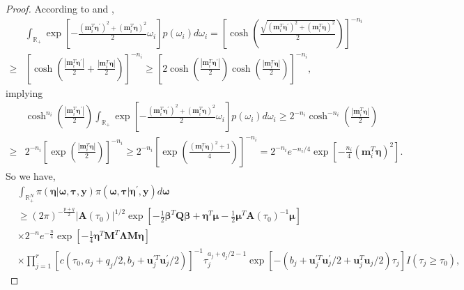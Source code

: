 \documentclass[11pt,a4paper]{article}
\begin{document}
\begin{proof}
According to \cite{polson2013bayesian} and \cite{choi2013polya}, 
\begin{align*}
 & \int_{\mathbb{R}_{+}}\exp\left[-\frac{\left(\bm{m}_{i}^{T}\bm{\eta}^{\prime}\right)^{2}+\left(\bm{m}_{i}^{T}\bm{\eta}\right)^{2}}{2}\omega_{i}\right]p\left(\omega_{i}\right)d\omega_{i} =  \left[\cosh\left(\frac{\sqrt{\left(\bm{m}_{i}^{T}\bm{\eta}^{\prime}\right)^{2}+\left(\bm{m}_{i}^{T}\bm{\eta}\right)^{2}}}{2}\right)\right]^{-n_{i}}\\
\geq & \left[\cosh\left(\frac{\left|\bm{m}_{i}^{T}\bm{\eta}^{\prime}\right|}{2}+\frac{ \left| \bm{m}_{i}^{T}\bm{\eta}\right|}{2}\right)\right]^{-n_{i}}
\geq  \left[2\cosh\left(\frac{\left|\bm{m}_{i}^{T}\bm{\eta}^{\prime}\right|}{2}\right)\cosh\left(\frac{\left|\bm{m}_{i}^{T}\bm{\eta}\right|}{2}\right)\right]^{-n_{i}},
\end{align*}
implying
\begin{align*}
 & \cosh^{n_{i}}\left(\frac{\left|\bm{m}_{i}^{T}\bm{\eta}^{\prime}\right|}{2}\right)\int_{\mathbb{R}_{+}}\exp\left[-\frac{\left(\bm{m}_{i}^{T}\bm{\eta}^{\prime}\right)^{2}+\left(\bm{m}_{i}^{T}\bm{\eta}\right)^{2}}{2}\omega_{i}\right]p\left(\omega_{i}\right)d\omega_{i} \geq 2^{-n_{i}}\cosh^{-n_{i}}\left(\frac{\left|\bm{m}_{i}^{T}\bm{\eta}\right|}{2}\right)\\
\geq & 2^{-n_{i}}\left[\exp\left(\frac{\left|\bm{m}_{i}^{T}\bm{\eta}\right|}{2}\right)\right]^{-n_{i}}\geq 2^{-n_{i}}\left[\exp\left(\frac{\left(\bm{m}_{i}^{T}\bm{\eta}\right)^{2}+1}{4}\right)\right]^{-n_{i}}
=  2^{-n_{i}}e^{-n_{i}/4}\exp\left[-\frac{n_{i}}{4}\left(\bm{m}_{i}^{T}\bm{\eta}\right)^{2}\right].
\end{align*}
So we have,
\begin{align*}
& \int_{\mathbb{R}_{+}^{N}}\pi(\bm{\eta}|\bm{\omega},\bm{\tau},\bm{y})\pi(\bm{\omega,\tau}|\bm{\eta}^{\prime},\bm{y})d\bm{\omega}\\
& \geq\left(2\pi\right)^{-\frac{p+q}{2}}\left|\bm{A}\left(\tau_{0}\right)\right|^{1/2}\exp\left[-\frac{1}{2}\bm{\beta}^{T}\bm{Q}\bm{\beta}+\bm{\eta}^{T}\bm{\mu}-\frac{1}{2}\bm{\mu}^{T}\bm{A}\left(\tau_{0}\right)^{-1}\bm{\mu}\right]\\
& \times 2^{-n}e^{-\frac{n}{4}}\exp\left[-\frac{1}{4}\bm{\eta}^{T}\bm{M}^{T}\bm{\Lambda}\bm{M}\bm{\eta}\right]\\
& \times\prod_{j=1}^{r}[c\left(\tau_{0},a_{j} + q_j/2,b_{j} +\bm{u}_{j}^{\prime T}\bm{u}_{j}^{\prime}/2\right)]^{-1}\tau_{j}^{a_{j}+q_{j}/2-1}\exp\left[-\left(b_{j}+\bm{u}_{j}^{\prime T}\bm{u}_{j}^{\prime}/2+\bm{u}_{j}^{T}\bm{u}_{j}/2\right)\tau_{j}\right]I(\tau_j \geq \tau_0),

\end{align*}
\end{proof}
\end{document}
